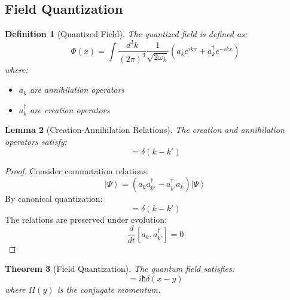 \documentclass[12pt]{article}
\newcommand{\ket}[1]{\left|#1\right\rangle}
\newtheorem{theorem}{Theorem}[section]
\newtheorem{lemma}[theorem]{Lemma}
\newtheorem{definition}[theorem]{Definition}
\begin{document}
\subsection{Field Quantization}
\begin{definition}[Quantized Field]
The quantized field is defined as:
\begin{equation}
\Phi(x) = \int\frac{d^3k}{(2\pi)^3}\frac{1}{\sqrt{2\omega_k}}(a_ke^{ikx} + a_k^\dagger e^{-ikx})
\end{equation}
where:
\begin{itemize}
\item $a_k$ are annihilation operators
\item $a_k^\dagger$ are creation operators
\end{itemize}
\end{definition}
\begin{lemma}[Creation-Annihilation Relations]
The creation and annihilation operators satisfy:
\begin{equation}
[a_k,a_{k'}^\dagger] = \delta(k-k')
\end{equation}
\end{lemma}
\begin{proof}
Consider commutation relations:
\begin{equation}
[a_k,a_{k'}^\dagger]\ket{\Psi} = (a_ka_{k'}^\dagger - a_{k'}^\dagger a_k)\ket{\Psi}
\end{equation}
By canonical quantization:
\begin{equation}
[a_k,a_{k'}^\dagger] = \delta(k-k')
\end{equation}
The relations are preserved under evolution:
\begin{equation}
\frac{d}{dt}[a_k,a_{k'}^\dagger] = 0
\end{equation}
\end{proof}
\begin{theorem}[Field Quantization]
The quantum field satisfies:
\begin{equation}
[\Phi(x),\Pi(y)] = iħ\delta(x-y)
\end{equation}
where $\Pi(y)$ is the conjugate momentum.
\end{theorem}
\end{document}
